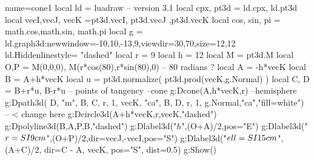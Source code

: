\documentclass[border=2 mm]{standalone}
\begin{document}
\begin{luadraw}{name=cone1}
local ld = luadraw -- version 3.1
local cpx, pt3d = ld.cpx, ld.pt3d
local vecI,vecJ, vecK =pt3d.vecI, pt3d.vecJ ,pt3d.vecK
local cos, sin, pi = math.cos,math.sin, math.pi
local g = ld.graph3d:new{window={-10,10,-13,9},viewdir={30,70},size={12,12}}
ld.Hiddenlinestyle= "dashed"
local r = 9
local h = 12
local M = pt3d.M
local O,P = M(0,0,0), M(r*cos(80),r*sin(80),0) -- 80 radians ?
local A = -h*vecK
local B = A+h*vecK
local u = pt3d.normalize( pt3d.prod(vecK,g.Normal) )
local C, D = B+r*u, B-r*u -- points of tangency
--cone
g:Dcone(A,h*vecK,r)
--hemisphere
g:Dpath3d( {D, "m", B, C, r, 1, vecK, "ca", B, D, r, 1, g.Normal,"ca"},"fill=white") -- < change here
g:Dcircle3d(A+h*vecK,r,vecK,"dashed")
g:Dpolyline3d({{B,A,P,B}},"dashed")
g:Dlabel3d("$h$",(O+A)/2,{pos="E"})
g:Dlabel3d("$r=\\SI{9}{cm}$",(O+P)/2,{dir={vecJ,-vecI},pos="S"})
g:Dlabel3d("$\\ell=\\SI{15}{cm}$", (A+C)/2, {dir={C - A, vecK}, pos="S", dist=0.5})
g:Show()
\end{luadraw}
\end{document}
